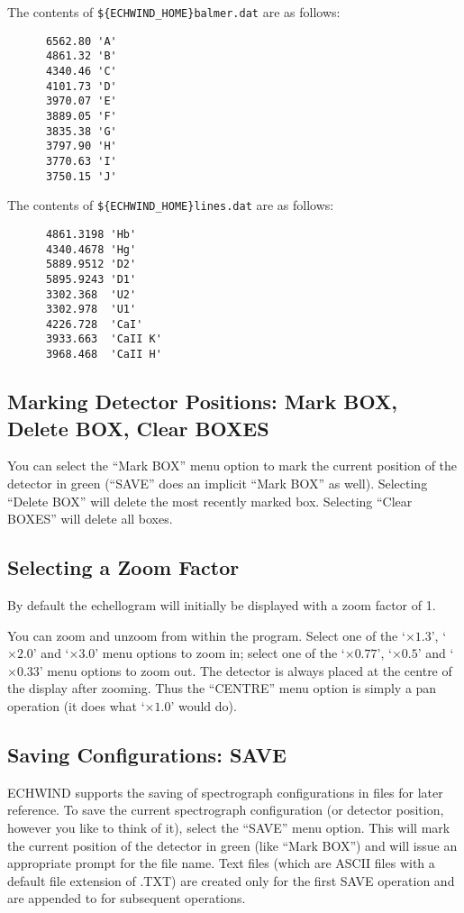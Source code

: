\documentclass[11pt]{article}
\begin{document}
The contents of \verb+${ECHWIND_HOME}balmer.dat+ are as follows:

\begin{verbatim}
      6562.80 'A'
      4861.32 'B'
      4340.46 'C'
      4101.73 'D'
      3970.07 'E'
      3889.05 'F'
      3835.38 'G'
      3797.90 'H'
      3770.63 'I'
      3750.15 'J'
\end{verbatim}

The contents of \verb+${ECHWIND_HOME}lines.dat+ are as follows:

\begin{verbatim}
      4861.3198 'Hb'
      4340.4678 'Hg'
      5889.9512 'D2'
      5895.9243 'D1'
      3302.368  'U2'
      3302.978  'U1'
      4226.728  'CaI'
      3933.663  'CaII K'
      3968.468  'CaII H'
\end{verbatim}

\subsection{Marking Detector Positions: Mark BOX, Delete BOX, Clear BOXES}

You can select the ``Mark BOX'' menu option to mark the current position of the
detector in green (``SAVE'' does an implicit ``Mark BOX'' as well). Selecting
``Delete BOX'' will delete the most recently marked box. Selecting ``Clear
BOXES'' will delete all boxes.

\subsection{Selecting a Zoom Factor}

By default the echellogram will initially be displayed with a zoom factor of 1.

You can zoom and unzoom from within the program. Select one of the `$
\times  1.3$', `$ \times 2.0$' and `$ \times 3.0$' menu options to zoom in;
select one of the `$ \times 0.77$', `$ \times 0.5$' and `$ \times 0.33$'
menu options to zoom out. The detector is always placed at the centre of
the display after zooming. Thus the ``CENTRE'' menu option is simply a pan
operation (it does what `$ \times 1.0$' would do).

\subsection{Saving Configurations: SAVE}

ECHWIND supports the saving of spectrograph configurations in files for
later reference. To save the current spectrograph configuration (or
detector position, however you like to think of it), select the ``SAVE''
menu option. This will mark the current position of the detector in green
(like ``Mark BOX'') and will issue an appropriate prompt for the file name.
Text files (which are ASCII files with a default file extension of
.TXT) are created only for the first SAVE operation and are appended to for
subsequent operations.
\end{document}
